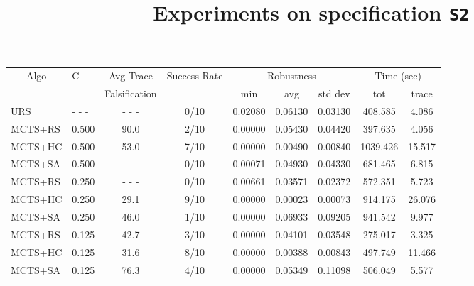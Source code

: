 \documentclass[11pt]{article}
\begin{document}
\begin{table}[ht]
\centering
\title{Experiments on specification \texttt{S2}}
\begin{tabular}{|l|l|c|c|c|c|c|c|c|}
\hline
\multicolumn{1}{|c|}{\multirow{2}{*}{Algo}} & \multirow{2}{*}{C} & Avg Trace               & \multirow{2}{*}{Success Rate} & \multicolumn{3}{c|}{Robustness} & \multicolumn{2}{c|}{Time (sec)} \\ \cline{5-9} 
\multicolumn{1}{|c|}{}                      &                    & Falsification           &                               & min      & avg      & std dev  & tot        & trace        \\ \hline
URS                                         & - - -              & - - -                   & 0/10                          & 0.02080  & 0.06130  & 0.03130  &  408.585   &  4.086       \\ \hline
MCTS+RS                                     & 0.500              &  90.0                   & 2/10                          & 0.00000  & 0.05430  & 0.04420  &  397.635   &  4.056       \\
MCTS+HC                                     & 0.500              &  53.0                   & 7/10                          & 0.00000  & 0.00490  & 0.00840  & 1039.426   & 15.517       \\
MCTS+SA                                     & 0.500              & - - -                   & 0/10                          & 0.00071  & 0.04930  & 0.04330  &  681.465   &  6.815       \\ \hline

MCTS+RS                                     & 0.250              & - - -                   & 0/10                          & 0.00661  & 0.03571  & 0.02372  &  572.351   &  5.723       \\
MCTS+HC                                     & 0.250              &  29.1                   & 9/10                          & 0.00000  & 0.00023  & 0.00073  &  914.175   & 26.076       \\
MCTS+SA                                     & 0.250              &  46.0                   & 1/10                          & 0.00000  & 0.06933  & 0.09205  &  941.542   &  9.977       \\ \hline

MCTS+RS                                     & 0.125              &  42.7                   & 3/10                          & 0.00000  & 0.04101  & 0.03548  &  275.017   &  3.325       \\
MCTS+HC                                     & 0.125              &  31.6                   & 8/10                          & 0.00000  & 0.00388  & 0.00843  &  497.749   & 11.466       \\
MCTS+SA                                     & 0.125              &  76.3                   & 4/10                          & 0.00000  & 0.05349  & 0.11098  &  506.049   &  5.577       \\ \hline


\end{tabular}
\end{table}
\end{document}
